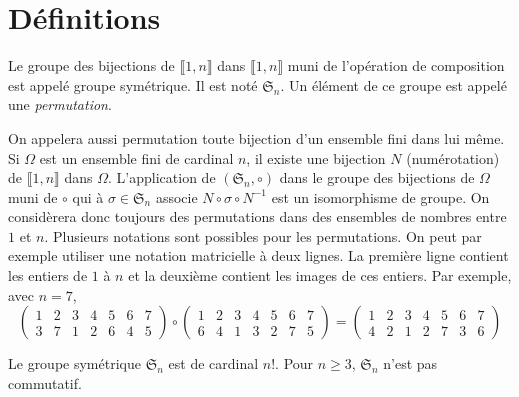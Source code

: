 

\section{Définitions}
\begin{defi}
 Le groupe des bijections de $\llbracket 1,n \rrbracket$ dans $\llbracket 1,n \rrbracket$ muni de l'opération de composition est appelé groupe symétrique. Il est noté $\mathfrak S_n$. Un élément de ce groupe est appelé une \emph{permutation}.
\end{defi}
On appelera aussi permutation toute bijection d'un ensemble fini dans lui même. Si $\Omega$ est un ensemble fini de cardinal $n$, il existe une bijection $N$ (numérotation) de $\llbracket 1,n \rrbracket$ dans $\Omega$. L'application de $(\mathfrak S_n,\circ)$ dans le groupe des bijections de $\Omega$ muni de $\circ$ qui à $\sigma\in \mathfrak{S}_n$ associe $N\circ \sigma \circ N^{-1}$ est un isomorphisme de groupe.\newline
On considèrera donc toujours des permutations dans des ensembles de nombres entre $1$ et $n$.
\newpage
Plusieurs notations sont possibles pour les permutations. On peut par exemple utiliser une notation matricielle à deux lignes. La première ligne contient les entiers de $1$ à $n$ et la deuxième contient les images de ces entiers. Par exemple, avec $n=7$,
\begin{displaymath}
 \begin{pmatrix}
  1 & 2 & 3 & 4 & 5 & 6 & 7 \\
  3 & 7 & 1 & 2 & 6 & 4 & 5
 \end{pmatrix}
\circ
 \begin{pmatrix}
  1 & 2 & 3 & 4 & 5 & 6 & 7 \\
  6 & 4 & 1 & 3 & 2 & 7 & 5
 \end{pmatrix}
=
 \begin{pmatrix}
  1 & 2 & 3 & 4 & 5 & 6 & 7 \\
  4 & 2 & 1 & 2 & 7 & 3 & 6
 \end{pmatrix}
\end{displaymath}
\newpage
\begin{propn}
 Le groupe symétrique $\mathfrak{S}_n$ est de cardinal $n!$. Pour $n\geq3$, $\mathfrak{S}_n$ n'est pas commutatif.
\end{propn}
